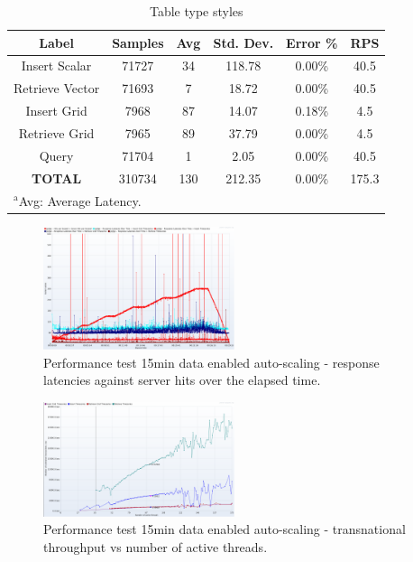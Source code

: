 \documentclass[conference]{IEEEtran}
\begin{document}
\begin{table}[htbp]
\caption{Table type styles}
\begin{center}
\begin{tabular}{|c|c|c|c|c|c|}
\hline
\textbf{Label} & \textbf{Samples} & \textbf{Avg} & \textbf{Std. Dev.} & \textbf{Error \%} & \textbf{RPS} \\ \hline
Insert Scalar & 71727 & 34 & 118.78 & 0.00\% & 40.5 \\ \hline
Retrieve Vector & 71693 & 7 & 18.72 & 0.00\% & 40.5 \\ \hline
Insert Grid & 7968 & 87 & 14.07 & 0.18\% & 4.5 \\ \hline
Retrieve Grid & 7965 & 89 & 37.79 & 0.00\% & 4.5 \\ \hline
Query & 71704 & 1 & 2.05 & 0.00\% & 40.5 \\ \hline
\textbf{TOTAL} & 310734 & 130 & 212.35 & 0.00\% & 175.3 \\ \hline
\multicolumn{4}{l}{$^{\mathrm{a}}$Avg: Average Latency.}
\end{tabular}
\label{ptab:obs_all_auto_15_min_summary_throughput}
\end{center}
\end{table}

\begin{figure}[htbp]
\centerline{\includegraphics[width=0.5\textwidth]{results/obs/all_auto/obs_all_auto_15m_res_latencies_against_hits.png}}
\caption{Performance test 15min data enabled auto-scaling - response latencies against server hits over the elapsed time.}
\label{pfi:test_obs_auto_all_15_min_latency_vs_hits}
\end{figure}

\begin{figure}[htbp]
\centerline{\includegraphics[width=0.5\textwidth]{results/obs/all_auto/obs_all_auto_15m_transaction_throughtput_vs_threads.png}}
\caption{Performance test 15min data enabled auto-scaling - transnational throughput vs number of active threads.}
\label{pfi:test_obs_auto_all_15_min_throughput_vs_threads}
\end{figure}
\end{document}
